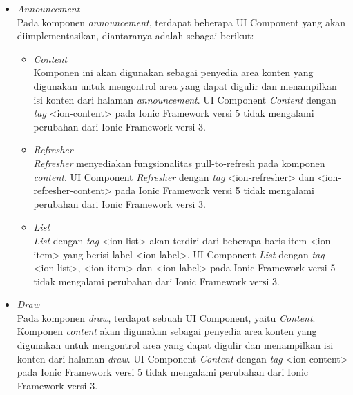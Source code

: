 \begin{itemize}
	\item \textit{Announcement} \\
	Pada komponen \textit{announcement}, terdapat beberapa UI Component yang akan diimplementasikan, diantaranya adalah sebagai berikut:
	\begin{itemize}
		\item \textit{Content} \\
		Komponen ini akan digunakan sebagai penyedia area konten yang digunakan untuk mengontrol area yang dapat digulir dan menampilkan isi konten dari halaman \textit{announcement}. UI Component \textit{Content} dengan \textit{tag} <ion-content> pada Ionic Framework versi 5 tidak mengalami perubahan dari Ionic Framework versi 3.
		
		\item \textit{Refresher} \\
		\textit{Refresher} menyediakan fungsionalitas  pull-to-refresh pada komponen \textit{content}. UI Component \textit{Refresher} dengan \textit{tag} <ion-refresher> dan <ion-refresher-content> pada Ionic Framework versi 5 tidak mengalami perubahan dari Ionic Framework versi 3.

		\item \textit{List} \\
		\textit{List} dengan \textit{tag} <ion-list> akan terdiri dari beberapa baris item <ion-item> yang berisi label <ion-label>. UI Component \textit{List} dengan \textit{tag} <ion-list>, <ion-item> dan <ion-label> pada Ionic Framework versi 5 tidak mengalami perubahan dari Ionic Framework versi 3.
		
	\end{itemize}
	
	\item \textit{Draw} \\
	Pada komponen \textit{draw}, terdapat sebuah UI Component, yaitu \textit{Content}. Komponen \textit{content} akan digunakan sebagai penyedia area konten yang digunakan untuk mengontrol area yang dapat digulir dan menampilkan isi konten dari halaman \textit{draw}. UI Component \textit{Content} dengan \textit{tag} <ion-content> pada Ionic Framework versi 5 tidak mengalami perubahan dari Ionic Framework versi 3. 
		

\end{itemize}
